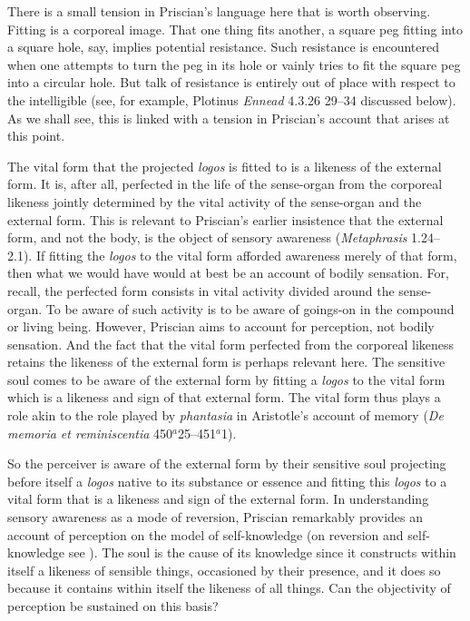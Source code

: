 \documentclass[12pt]{article}
\begin{document}
There is a small tension in Priscian's language here that is worth observing. Fitting is a corporeal image. That one thing fits another, a square peg fitting into a square hole, say, implies potential resistance. Such resistance is encountered when one attempts to turn the peg in its hole or vainly tries to fit the square peg into a circular hole. But talk of resistance is entirely out of place with respect to the intelligible (see, for example, Plotinus \emph{Ennead} 4.3.26 29–34 discussed below). As we shall see, this is linked with a tension in Priscian's account that arises at this point.

The vital form that the projected \emph{logos} is fitted to is a likeness of the external form. It is, after all, perfected in the life of the sense-organ from the corporeal likeness jointly determined by the vital activity of the sense-organ and the external form. This is relevant to Priscian's earlier insistence that the external form, and not the body, is the object of sensory awareness (\emph{Metaphrasis} 1.24--2.1). If fitting the \emph{logos} to the vital form afforded awareness merely of that form, then what we would have would at best be an account of bodily sensation. For, recall, the perfected form consists in vital activity divided around the sense-organ. To be aware of such activity is to be aware of goings-on in the compound or living being. However, Priscian aims to account for perception, not bodily sensation. And the fact that the vital form perfected from the corporeal likeness retains the likeness of the external form is perhaps relevant here. The sensitive soul comes to be aware of the external form by fitting a \emph{logos} to the vital form which is a likeness and sign of that external form. The vital form thus plays a role akin to the role played by \emph{phantasia} in Aristotle's account of memory (\emph{De memoria et reminiscentia} 450\( ^{a} \)25–451\( ^{a} \)1).

So the perceiver is aware of the external form by their sensitive soul projecting before itself a \emph{logos} native to its substance or essence and fitting this \emph{logos} to a vital form that is a likeness and sign of the external form. In understanding sensory awareness as a mode of reversion, Priscian remarkably provides an account of perception on the model of self-knowledge (on reversion and self-knowledge see \citealt{Lautner:1994cs}). The soul is the cause of its knowledge since it constructs within itself a likeness of sensible things, occasioned by their presence, and it does so because it contains within itself the likeness of all things. Can the objectivity of perception be sustained on this basis?
\end{document}
